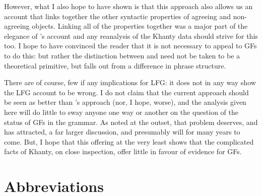\documentclass[output=paper
,modfonts
,nonflat]{langsci/langscibook}
\begin{document}
However, what I also hope to have shown is that this approach also allows us an account that links together the other syntactic properties of agreeing and non-agreeing objects.
Linking all of the properties together was a major part of the elegance of \citeauthor{dn2011}'s account and any reanalysis of the Khanty data should strive for this too.
I hope to have convinced the reader that it is not necessary to appeal to GFs to do this: but rather the distinction between \object{} and \robj{} need not be taken to be a theoretical primitive, but falls out from a difference in phrase structure.

There are of course, few if any implications for LFG: it does not in any way show the LFG account to be wrong.
I do not claim that the current approach should be seen as better than \citeauthor{dn2011}'s approach (nor, I hope, worse), and the analysis given here will do little to sway anyone one way or another on the question of the status of GFs in the grammar.
As noted at the outset, that problem deserves, and has attracted, a far larger discussion, and presumably will for many years to come.
But, I hope that this offering at the very least shows that the complicated facts of Khanty, on close inspection, offer little in favour of evidence for GFs.

\section*{Abbreviations}
\end{document}
